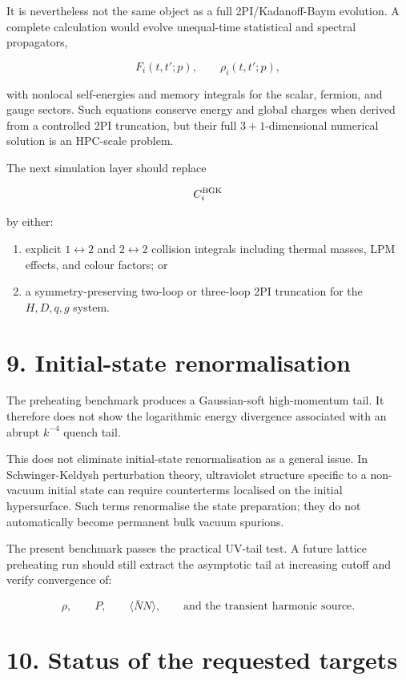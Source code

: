 \documentclass[
  10pt,
]{article}
\providecommand{\tightlist}{%
  \setlength{\itemsep}{0pt}\setlength{\parskip}{0pt}}
\begin{document}
It is nevertheless not the same object as a full 2PI/Kadanoff-Baym
evolution. A complete calculation would evolve unequal-time statistical
and spectral propagators,

\[
F_i(t,t';p),
\qquad
\rho_i(t,t';p),
\]

with nonlocal self-energies and memory integrals for the scalar,
fermion, and gauge sectors. Such equations conserve energy and global
charges when derived from a controlled 2PI truncation, but their full
\(3+1\)-dimensional numerical solution is an HPC-scale problem.

The next simulation layer should replace

\[
C_i^{\rm BGK}
\]

by either:

\begin{enumerate}
\def\labelenumi{\arabic{enumi}.}
\tightlist
\item
  explicit \(1\leftrightarrow2\) and \(2\leftrightarrow2\) collision
  integrals including thermal masses, LPM effects, and colour factors;
  or
\item
  a symmetry-preserving two-loop or three-loop 2PI truncation for the
  \(H,D,q,g\) system.
\end{enumerate}

\section{9. Initial-state
renormalisation}\label{initial-state-renormalisation}

The preheating benchmark produces a Gaussian-soft high-momentum tail. It
therefore does not show the logarithmic energy divergence associated
with an abrupt \(k^{-4}\) quench tail.

This does not eliminate initial-state renormalisation as a general
issue. In Schwinger-Keldysh perturbation theory, ultraviolet structure
specific to a non-vacuum initial state can require counterterms
localised on the initial hypersurface. Such terms renormalise the state
preparation; they do not automatically become permanent bulk vacuum
spurions.

The present benchmark passes the practical UV-tail test. A future
lattice preheating run should still extract the asymptotic tail at
increasing cutoff and verify convergence of:

\[
\rho,
\qquad
P,
\qquad
\langle\bar NN\rangle,
\qquad
\text{and the transient harmonic source}.
\]

\section{10. Status of the requested
targets}\label{status-of-the-requested-targets}
\end{document}
